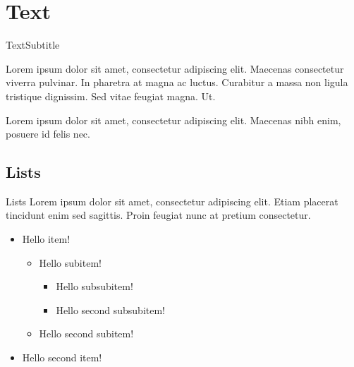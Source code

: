 \documentclass[aspectratio=169]{beamer}
\begin{document}
\section{Text}
\begin{frame}{Text}{Subtitle}


    Lorem ipsum dolor sit amet, consectetur adipiscing elit. Maecenas consectetur viverra pulvinar. In pharetra at magna ac luctus. Curabitur a massa non ligula tristique dignissim. Sed vitae feugiat magna. Ut.

    Lorem ipsum dolor sit amet, consectetur adipiscing elit. Maecenas nibh enim, posuere id felis nec.
\end{frame}







\subsection{Lists}

\begin{frame}{Lists}
    Lorem ipsum dolor sit amet, consectetur adipiscing elit. Etiam placerat tincidunt enim sed sagittis. Proin feugiat nunc at pretium consectetur.
    \begin{itemize}
        \item Hello item!
        \begin{itemize}
            \item Hello subitem!
            \begin{itemize}
                \item Hello subsubitem!
                \item Hello second subsubitem!
            \end{itemize}
            \item Hello second subitem!
        \end{itemize}
        \item Hello second item!
    \end{itemize}
\end{frame}
\end{document}
